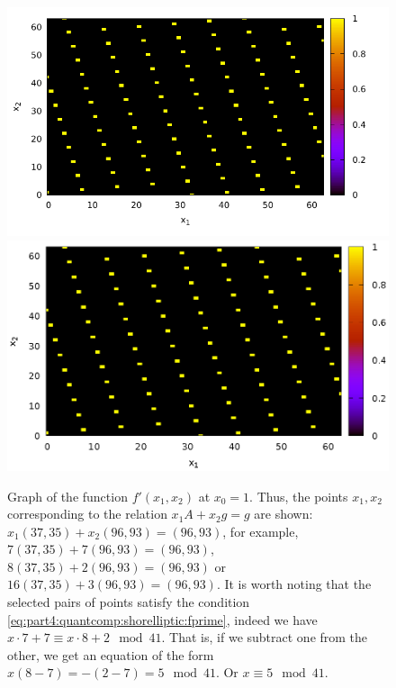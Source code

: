 \begin{figure}
\centering

\ifpdf
\includegraphics[angle=0]
{./part4/quantcomp/picellipticdiscretlog1.pdf}
\else
\includegraphics[angle=0]
{./part4/quantcomp/picellipticdiscretlog1.eps}
\fi

%




\caption{Graph of the function 
$f'(x_1, x_2)$ at $x_0 = 1$. Thus, the points $x_1, x_2$
  corresponding to the relation $x_1 A + x_2 g = g$ are shown: 
  $x_1 (37, 35) + x_2 (96,93) = (96,93)$, for example,
  $7 (37, 35) + 7 (96,93) = (96,93)$, $8 (37, 35) + 2 (96,93) =
  (96,93)$ or $16 (37, 35) + 3 (96,93) =
  (96,93)$. It is worth noting that the selected pairs of points satisfy
  the condition \eqref{eq:part4:quantcomp:shorelliptic:fprime}, indeed
 we have $x \cdot 7 + 7 \equiv x \cdot 8 + 2 \mod 41$. 
 That is, if we subtract one from the other, we get an equation of the form $x \left(8-7\right) = - (2 - 7) = 5 \mod 41$.
 Or $x \equiv 5 \mod 41$.} 
\label{fig:part4:quantcomp:dle1}
\end{figure}